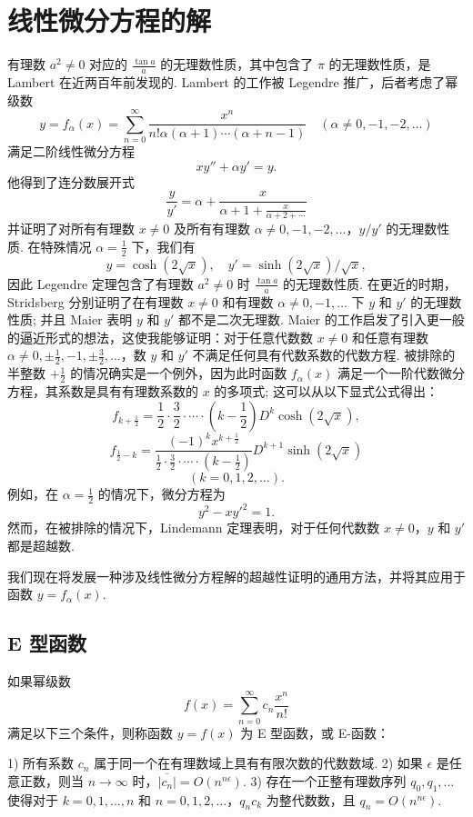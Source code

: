 \chapter{线性微分方程的解}

有理数 $a^2 \neq 0$ 对应的 $\frac{\tan a}{a}$ 的无理数性质，其中包含了 $\pi$ 的无理数性质，是 Lambert 在近两百年前发现的. Lambert 的工作被 Legendre 推广，后者考虑了幂级数
\[
y = f_{\alpha}(x) = \sum_{n=0}^{\infty} \frac{x^n}{n! \alpha(\alpha+1) \cdots (\alpha+n-1)} \quad (\alpha \neq 0, -1, -2, \ldots)
\]
满足二阶线性微分方程
\[xy'' + \alpha y' = y.\]
他得到了连分数展开式
\[\frac{y}{y'} = \alpha + \frac{x}{\alpha + 1 + \frac{x}{\alpha + 2 + \cdots}}\]
并证明了对所有有理数 $x \neq 0$ 及所有有理数 $\alpha \neq 0, -1, -2, \ldots$，$y/y'$ 的无理数性质. 在特殊情况 $\alpha = \frac{1}{2}$ 下，我们有
\[y = \cosh (2\sqrt{x}), \quad y' = \sinh (2\sqrt{x})/\sqrt{x},\]
因此 Legendre 定理包含了有理数 $a^2 \neq 0$ 时 $\frac{\tan a}{a}$ 的无理数性质. 在更近的时期，Stridsberg 分别证明了在有理数 $x \neq 0$ 和有理数 $\alpha \neq 0, -1, \ldots$ 下 $y$ 和 $y'$ 的无理数性质; 并且 Maier 表明 $y$ 和 $y'$ 都不是二次无理数. Maier 的工作启发了引入更一般的逼近形式的想法，这使我能够证明：对于任意代数数 $x \neq 0$ 和任意有理数 $\alpha \neq 0, \pm \frac{1}{2}, -1, \pm \frac{3}{2}, \ldots$，数 $y$ 和 $y'$ 不满足任何具有代数系数的代数方程. 被排除的半整数 $+ \frac{1}{2}$ 的情况确实是一个例外，因为此时函数 $f_{\alpha}(x)$ 满足一个一阶代数微分方程，其系数是具有有理数系数的 $x$ 的多项式; 这可以从以下显式公式得出：
\[f_{k+\frac{1}{2}} = \frac{1}{2} \cdot \frac{3}{2} \cdot \cdots \cdot \left(k - \frac{1}{2}\right) D^{k} \cosh (2\sqrt{x}),\]
\[f_{\frac{1}{2}-k} = \frac{(-1)^{k} x^{k+\frac{1}{2}}}{\frac{1}{2} \cdot \frac{3}{2} \cdot \cdots \cdot \left(k - \frac{1}{2}\right)} D^{k+1} \sinh (2\sqrt{x})\]
\[(k=0,1,2,\ldots).\]
例如，在 $\alpha = \frac{1}{2}$ 的情况下，微分方程为
\[y^2 - xy'^2 = 1.\]
然而，在被排除的情况下，Lindemann 定理表明，对于任何代数数 $x \neq 0$，$y$ 和 $y'$ 都是超越数.

我们现在将发展一种涉及线性微分方程解的超越性证明的通用方法，并将其应用于函数 $y=f_{\alpha}(x)$.

\section{E 型函数}

如果幂级数
\[f(x) = \sum_{n=0}^{\infty} c_n \frac{x^n}{n!}\]
满足以下三个条件，则称函数 $y = f(x)$ 为 E 型函数，或 E-函数：

1) 所有系数 $c_n$ 属于同一个在有理数域上具有有限次数的代数数域.
2) 如果 $\epsilon$ 是任意正数，则当 $n \to \infty$ 时，$\overline{|c_n|} = O(n^{n\epsilon})$.
3) 存在一个正整有理数序列 $q_0, q_1, \ldots$ 使得对于 $k = 0, 1, \ldots, n$ 和 $n = 0, 1, 2, \ldots$，$q_n c_k$ 为整代数数，且 $q_n = O(n^{n\epsilon})$.

